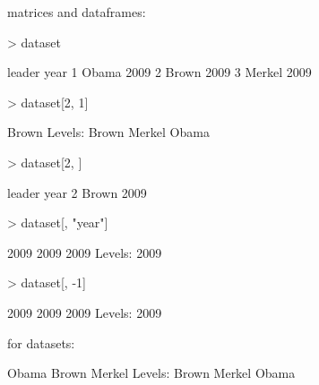 \documentclass[handout]{beamer}
\newcommand{\red}{\color{red}}
\newcommand{\black}{\color{black}}
\begin{document}
\begin{frame}[fragile]
matrices and dataframes:
\bigskip
\red
\footnotesize
\begin{Schunk}
\begin{Sinput}
> dataset
\end{Sinput}
\begin{Soutput}
  leader year
1  Obama 2009
2  Brown 2009
3 Merkel 2009
\end{Soutput}
\end{Schunk}
\pause
\bigskip
\begin{Schunk}
\begin{Sinput}
> dataset[2, 1]
\end{Sinput}
\begin{Soutput}
[1] Brown
Levels: Brown Merkel Obama
\end{Soutput}
\end{Schunk}
\pause
\bigskip
\begin{Schunk}
\begin{Sinput}
> dataset[2, ]
\end{Sinput}
\begin{Soutput}
  leader year
2  Brown 2009
\end{Soutput}
\end{Schunk}
\end{frame}

\begin{frame}[fragile]
\footnotesize
\red
\begin{Schunk}
\begin{Sinput}
> dataset[, "year"]
\end{Sinput}
\begin{Soutput}
[1] 2009 2009 2009
Levels: 2009
\end{Soutput}
\end{Schunk}
\pause
\bigskip
\begin{Schunk}
\begin{Sinput}
> dataset[, -1]
\end{Sinput}
\begin{Soutput}
[1] 2009 2009 2009
Levels: 2009
\end{Soutput}
\end{Schunk}
\pause
\bigskip
\black
\normalsize
for datasets:
\red
\footnotesize
\pause
\bigskip
\begin{Schunk}
\begin{Soutput}
[1] Obama  Brown  Merkel
Levels: Brown Merkel Obama
\end{Soutput}
\end{Schunk}
\end{frame}
\end{document}
